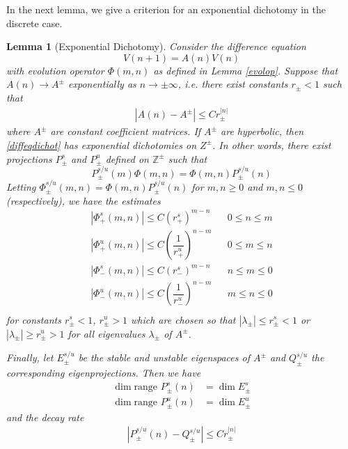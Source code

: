 \documentclass[12pt]{article}
\def\Z{{\mathbb Z}}
\newtheorem{lemma}{Lemma}
\begin{document}
In the next lemma, we give a criterion for an exponential dichotomy in the discrete case.

\begin{lemma}[Exponential Dichotomy]\label{dichotomy}
Consider the difference equation
\begin{equation}\label{diffeqdichot}
V(n+1) = A(n) V(n)
\end{equation}
with evolution operator $\Phi(m, n)$ as defined in Lemma \ref{evolop}. Suppose that $A(n) \rightarrow A^\pm$ exponentially as $n \rightarrow \pm \infty$, i.e. there exist constants $r_\pm < 1$ such that
\begin{align*}
|A(n) - A^\pm| \leq C r_\pm^{|n|}
\end{align*}
where $A^\pm$ are constant coefficient matrices. If $A^\pm$ are hyperbolic, then \eqref{diffeqdichot} has exponential dichotomies on $Z^\pm$. In other words, there exist projections $P_\pm^s$ and $P_\pm^u$ defined on $\Z^\pm$ such that
\begin{equation}\label{projcommute}
P_\pm^{s/u}(m) \Phi(m, n) =  \Phi(m, n) P_\pm^{s/u}(n)
\end{equation}
Letting $\Phi_\pm^{s/u}(m, n) = \Phi(m, n) P_\pm^{s/u}(n)$ for $m, n \geq 0$ and $m, n \leq 0$ (respectively), we have the estimates
\begin{align*}
|\Phi_+^s(m, n)| \leq C (r_+^s)^{m - n} && 0 \leq n \leq m \\
|\Phi_+^u(m, n)| \leq C \left( \dfrac{1}{r_+^u} \right)^{n-m} && 0 \leq m \leq n \\
|\Phi_-^s(m, n)| \leq C (r_-^s)^{m - n} && n \leq m \leq 0 \\
|\Phi_-^u(m, n)| \leq C \left( \dfrac{1}{r_-^u} \right)^{n-m} && m \leq n \leq 0\\
\end{align*}
for constants $r_\pm^s < 1$, $r_\pm^u > 1$ which are chosen so that $|\lambda_\pm| \leq r_\pm^s < 1$ or $|\lambda_\pm| \geq r_\pm^u > 1$ for all eigenvalues $\lambda_\pm$ of $A^\pm$. 
 
Finally, let $E_\pm^{s/u}$ be the stable and unstable eigenspaces of $A^\pm$ and $Q_\pm^{s/u}$ the corresponding eigenprojections. Then we have
\begin{align*}
\dim \text{range }P_\pm^s(n) &= \dim E_\pm^s \\
\dim \text{range }P_\pm^u(n) &= \dim E_\pm^u
\end{align*}
and the decay rate
\begin{align}\label{projbound}
| P_\pm^{s/u}(n) - Q_\pm^{s/u} | \leq C r_\pm^{|n|}
\end{align}


\end{lemma}
\end{document}
